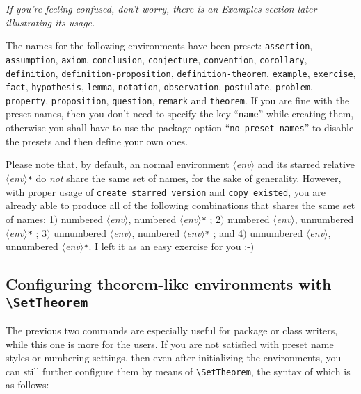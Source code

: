 \documentclass[classical]{einfart}
\providecommand{\meta}[1]{$\langle${\normalfont\itshape#1}$\rangle$}
\newenvironment{tip}[1][Tip]{%
    \LocallyStopLineNumbers%
    \begin{tcolorbox}[breakable,
        enhanced,
        width = \textwidth,
        colback = paper, colbacktitle = paper,
        colframe = gray!50, boxrule=0.2mm,
        coltitle = black,
        fonttitle = \sffamily,
        attach boxed title to top left = {yshift=-\tcboxedtitleheight/2, xshift=.5cm},
        boxed title style = {boxrule=0pt, colframe=paper},
        before skip = 3mm,
        after skip = 3mm,
        top = 2.5mm,
        bottom = 1.5mm,
        title={\scshape\sffamily #1}]%
}{\end{tcolorbox}\ResumeLineNumbers}
\newcommand{\packageoption}[1]{\texttt{\textcolor{black!67!green}{#1}}}
\newcommand{\commandoption}[1]{\texttt{\textcolor{black!67!cyan}{#1}}}
\begin{document}
\begin{center}
    \itshape
    If you're feeling confused, don't worry, there is an Examples section later illustrating its usage.
\end{center}

\begin{tip}
    The names for the following environments have been preset: \texttt{assertion}, \texttt{assumption}, \texttt{axiom}, \texttt{conclusion}, \texttt{conjecture}, \texttt{convention}, \texttt{corollary}, \texttt{definition}, \texttt{definition-proposition}, \texttt{definition-theorem}, \texttt{example}, \texttt{exercise}, \texttt{fact}, \texttt{hypothesis}, \texttt{lemma}, \texttt{notation}, \texttt{observation}, \texttt{postulate}, \texttt{problem}, \texttt{property}, \texttt{proposition}, \texttt{question}, \texttt{remark} and \texttt{theorem}. If you are fine with the preset names, then you don't need to specify the key ``\commandoption{name}'' while creating them, otherwise you shall have to use the package option ``\packageoption{no preset names}'' to disable the presets and then define your own ones.
\end{tip}

\medskip

Please note that, by default, an normal environment \meta{env} and its starred relative \meta{env}\texttt{*} do \emph{not} share the same set of names, for the sake of generality. However, with proper usage of \commandoption{create starred version} and \commandoption{copy existed}, you are already able to produce all of the following combinations that shares the same set of names: 1$)$ numbered \meta{env}, numbered \meta{env}\texttt{*} ; 2$)$ numbered \meta{env}, unnumbered \meta{env}\texttt{*} ; 3$)$ unnumbered \meta{env}, numbered \meta{env}\texttt{*} ; and 4$)$ unnumbered \meta{env}, unnumbered \meta{env}\texttt{*}. I left it as an easy exercise for you ;-)


\bigskip
\subsection[Configuring theorem-like environments]{Configuring theorem-like environments with \texttt{\textbackslash\textcolor{maintheme}{SetTheorem}}}

The previous two commands are especially useful for package or class writers, while this one is more for the users. If you are not satisfied with preset name styles or numbering settings, then even after initializing the environments, you can still further configure them by means of \lstinline|\SetTheorem|, the syntax of which is as follows:
\end{document}
